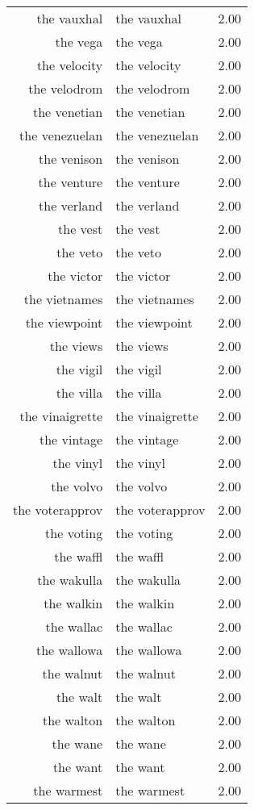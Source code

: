\begin{table}[ht]
\begin{tabular}{rlr}
  the vauxhal & the vauxhal & 2.00 \\ 
  the vega & the vega & 2.00 \\ 
  the velocity & the velocity & 2.00 \\ 
  the velodrom & the velodrom & 2.00 \\ 
  the venetian & the venetian & 2.00 \\ 
  the venezuelan & the venezuelan & 2.00 \\ 
  the venison & the venison & 2.00 \\ 
  the venture & the venture & 2.00 \\ 
  the verland & the verland & 2.00 \\ 
  the vest & the vest & 2.00 \\ 
  the veto & the veto & 2.00 \\ 
  the victor & the victor & 2.00 \\ 
  the vietnames & the vietnames & 2.00 \\ 
  the viewpoint & the viewpoint & 2.00 \\ 
  the views & the views & 2.00 \\ 
  the vigil & the vigil & 2.00 \\ 
  the villa & the villa & 2.00 \\ 
  the vinaigrette & the vinaigrette & 2.00 \\ 
  the vintage & the vintage & 2.00 \\ 
  the vinyl & the vinyl & 2.00 \\ 
  the volvo & the volvo & 2.00 \\ 
  the voterapprov & the voterapprov & 2.00 \\ 
  the voting & the voting & 2.00 \\ 
  the waffl & the waffl & 2.00 \\ 
  the wakulla & the wakulla & 2.00 \\ 
  the walkin & the walkin & 2.00 \\ 
  the wallac & the wallac & 2.00 \\ 
  the wallowa & the wallowa & 2.00 \\ 
  the walnut & the walnut & 2.00 \\ 
  the walt & the walt & 2.00 \\ 
  the walton & the walton & 2.00 \\ 
  the wane & the wane & 2.00 \\ 
  the want & the want & 2.00 \\ 
  the warmest & the warmest & 2.00 \\ 

\end{tabular}
\end{table}
